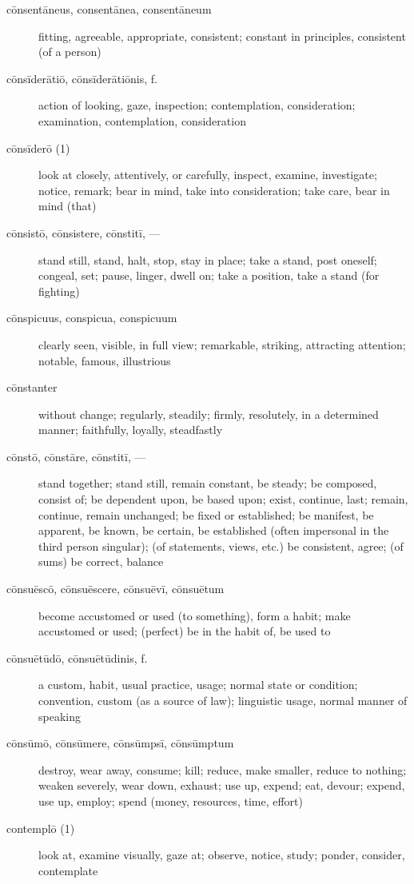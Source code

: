 \begin{description}
    \item[cōnsentāneus, consentānea, consentāneum] fitting, agreeable, appropriate, consistent; constant in principles, consistent (of a person)
    \item[cōnsīderātiō, cōnsīderātiōnis, f.] action of looking, gaze, inspection; contemplation, consideration; examination, contemplation, consideration
    \item[cōnsīderō (1)] look at closely, attentively, or carefully, inspect, examine, investigate; notice, remark; bear in mind, take into consideration; take care, bear in mind (that)
    \item[cōnsistō, cōnsistere, cōnstitī, ---] stand still, stand, halt, stop, stay in place; take a stand, post oneself; congeal, set; pause, linger, dwell on; take a position, take a stand (for fighting)
    \item[cōnspicuus, conspicua, conspicuum] clearly seen, visible, in full view; remarkable, striking, attracting attention; notable, famous, illustrious
    \item[cōnstanter] without change; regularly, steadily; firmly, resolutely, in a determined manner; faithfully, loyally, steadfastly
    \item[cōnstō, cōnstāre, cōnstitī, ---] stand together; stand still, remain constant, be steady; be composed, consist of; be dependent upon, be based upon; exist, continue, last; remain, continue, remain unchanged; be fixed or established; be manifest, be apparent, be known, be certain, be established (often impersonal in the third person singular); (of statements, views, etc.) be consistent, agree; (of sums) be correct, balance
    \item[cōnsuēscō, cōnsuēscere, cōnsuēvī, cōnsuētum]  become accustomed or used (to something), form a habit; make accustomed or used; (perfect) be in the habit of, be used to
    \item[cōnsuētūdō, cōnsuētūdinis, f.] a custom, habit, usual practice, usage; normal state or condition; convention, custom (as a source of law); linguistic usage, normal manner of speaking
    \item[cōnsūmō, cōnsūmere, cōnsūmpsī, cōnsūmptum] destroy, wear away, consume; kill; reduce, make smaller, reduce to nothing; weaken severely, wear down, exhaust; use up, expend; eat, devour; expend, use up, employ; spend (money, resources, time, effort)
    \item[contemplō (1)] look at, examine visually, gaze at; observe, notice, study; ponder, consider, contemplate

\end{description}
